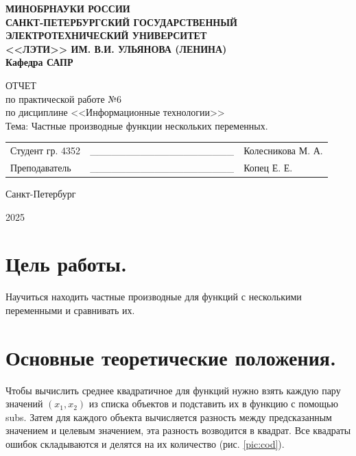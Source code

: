 \documentclass[14pt,a4paper]{extarticle}
\begin{document}
\begin{titlepage}
    \begin{center}
    {\bfseries
    МИНОБРНАУКИ РОССИИ \\ САНКТ-ПЕТЕРБУРГСКИЙ ГОСУДАРСТВЕННЫЙ \\ ЭЛЕКТРОТЕХНИЧЕСКИЙ УНИВЕРСИТЕТ \\ <<ЛЭТИ>> ИМ. В.И. УЛЬЯНОВА (ЛЕНИНА)\\Кафедра САПР \vspace{0.23\textheight}
    
    ОТЧЕТ \\ по практической работе №6 \\ по дисциплине <<Информационные технологии>> \\ Тема: Частные производные функции нескольких переменных. \\
    \vspace{0.28\textheight}
        }
        \begin{table}[h!]
            \begin{tabularx}{\textwidth}{p{60mm}X>{\centering\arraybackslash}p{45mm}}
                Студент гр. 4352 & \_\_\_\_\_\_\_\_\_\_\_\_\_\_\_\_\_\_\_\_ & {Колесникова М. А.} \\ [5.4mm]  
                Преподаватель    & \_\_\_\_\_\_\_\_\_\_\_\_\_\_\_\_\_\_\_\_ & {Копец Е. Е.} \\ [5.4mm]
            \end{tabularx}
        \end{table}
    Санкт-Петербург\par
        2025
    \end{center}
\end{titlepage}
\setcounter{page}{2}

\section*{Цель работы.}

Научиться находить частные производные для функций с несколькими переменными и сравнивать их.

\section*{Основные теоретические положения.}

Чтобы вычислить среднее квадратичное для функций нужно взять каждую пару значений $(x_1,x_2)$
из списка объектов и подставить их в функцию с помощью subs. Затем для каждого объекта вычисляется
разность между предсказанным значением и целевым значением, эта разность возводится в квадрат.
Все квадраты ошибок складываются и делятся на их количество (рис. \ref{pic:cod}).
\end{document}
